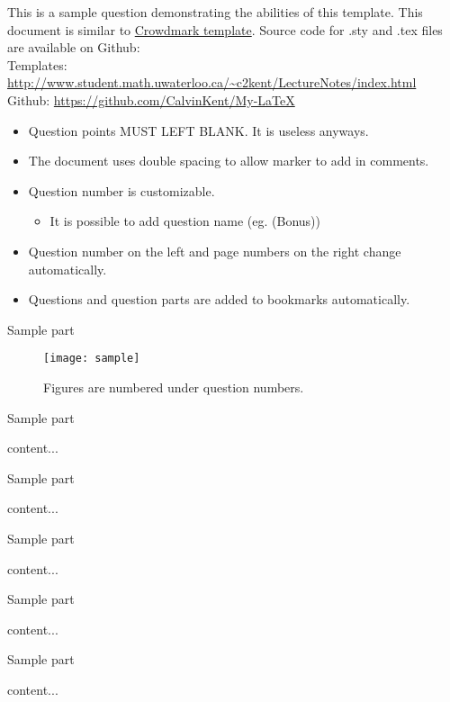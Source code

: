 \documentclass[12pt]{article} %
\begin{document}
\begin{qstn}[15][(Bonus) ][]
	This is a sample question demonstrating the abilities of this template. This document is similar to \href{http://www.student.math.uwaterloo.ca/~c2kent/LectureNotes/templates/Crowdmark.pdf#page=7}{Crowdmark template}. Source code for .sty and .tex files are available on Github:\\
	Templates: \url{http://www.student.math.uwaterloo.ca/~c2kent/LectureNotes/index.html}\\
	Github: \url{https://github.com/CalvinKent/My-LaTeX}
	\begin{itemize}
		\item Question points MUST LEFT BLANK. It is useless anyways.
		\item The document uses double spacing to allow marker to add in comments.
		\item Question number is customizable.
		\begin{itemize}
			\item It is possible to add question name (eg. (Bonus))
		\end{itemize}
		\item Question number on the left and page numbers on the right change automatically.
		\item Questions and question parts are added to bookmarks automatically.
	\end{itemize}
	\begin{soln}
	\end{soln}
	\begin{assgnenum}
		\qitem Sample part
		\begin{soln}
			\begin{figure}[H]
				\centering
				\texttt{[image: sample]}
				\caption{Figures are numbered under question numbers.}
			\end{figure}
			\vfill
		\end{soln}
		\newpage
		\qitem Sample part
		\begin{soln}
			content...
			\vfill
		\end{soln}
		\begin{assgnenum}
			\qitem Sample part
			\begin{soln}
				content...
				\vfill
			\end{soln}
			\qitem Sample part
			\begin{soln}
				content...
				\vfill
			\end{soln}
			\newpage
			\qitem Sample part
			\begin{soln}
				content...
				\vfill
			\end{soln}
		\end{assgnenum}
		\qitem Sample part
		\begin{soln}
			content...
			\vfill
		\end{soln}
	\end{assgnenum}
\end{qstn}
\end{document}

